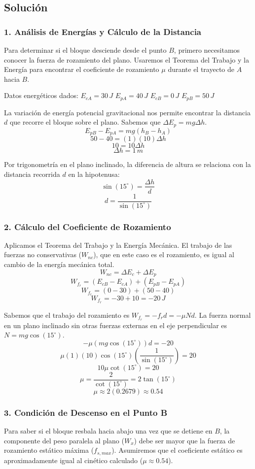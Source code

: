 \documentclass[12pt, a4paper]{article}
\begin{document}
\subsection*{Solución}

\subsubsection*{1. Análisis de Energías y Cálculo de la Distancia}
Para determinar si el bloque desciende desde el punto $B$, primero necesitamos conocer la fuerza de rozamiento del plano. Usaremos el Teorema del Trabajo y la Energía para encontrar el coeficiente de rozamiento $\mu$ durante el trayecto de $A$ hacia $B$.

Datos energéticos dados:
$E_{cA} = 30 \, \si{J}$
$E_{pA} = 40 \, \si{J}$
$E_{cB} = 0 \, \si{J}$
$E_{pB} = 50 \, \si{J}$

La variación de energía potencial gravitacional nos permite encontrar la distancia $d$ que recorre el bloque sobre el plano. Sabemos que $\Delta E_p = mg \Delta h$.
$$E_{pB} - E_{pA} = mg(h_B - h_A)$$
$$50 - 40 = (1)(10)\Delta h$$
$$10 = 10 \Delta h$$
$$\Delta h = 1 \, \si{m}$$

Por trigonometría en el plano inclinado, la diferencia de altura se relaciona con la distancia recorrida $d$ en la hipotenusa:
$$\sin(15^\circ) = \frac{\Delta h}{d}$$
$$d = \frac{1}{\sin(15^\circ)}$$

\subsubsection*{2. Cálculo del Coeficiente de Rozamiento}
Aplicamos el Teorema del Trabajo y la Energía Mecánica. El trabajo de las fuerzas no conservativas ($W_{nc}$), que en este caso es el rozamiento, es igual al cambio de la energía mecánica total.
$$W_{nc} = \Delta E_c + \Delta E_p$$
$$W_{f_r} = (E_{cB} - E_{cA}) + (E_{pB} - E_{pA})$$
$$W_{f_r} = (0 - 30) + (50 - 40)$$
$$W_{f_r} = -30 + 10 = -20 \, \si{J}$$

Sabemos que el trabajo del rozamiento es $W_{f_r} = -f_r d = -\mu N d$. La fuerza normal en un plano inclinado sin otras fuerzas externas en el eje perpendicular es $N = mg \cos(15^\circ)$.
$$-\mu (mg \cos(15^\circ)) d = -20$$
$$\mu (1)(10) \cos(15^\circ) \left(\frac{1}{\sin(15^\circ)}\right) = 20$$
$$10 \mu \cot(15^\circ) = 20$$
$$\mu = \frac{2}{\cot(15^\circ)} = 2 \tan(15^\circ)$$
$$\mu \approx 2(0.2679) \approx 0.54$$

\subsubsection*{3. Condición de Descenso en el Punto B}
Para saber si el bloque resbala hacia abajo una vez que se detiene en $B$, la componente del peso paralela al plano ($W_x$) debe ser mayor que la fuerza de rozamiento estático máxima ($f_{s,max}$). Asumiremos que el coeficiente estático es aproximadamente igual al cinético calculado ($\mu \approx 0.54$).
\end{document}
